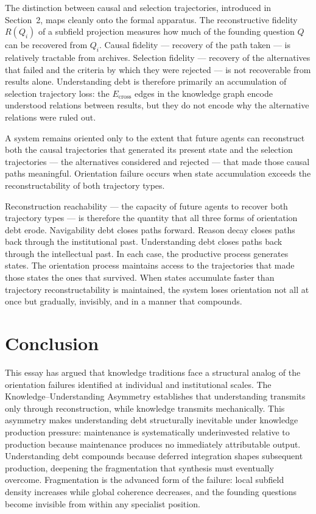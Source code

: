 The distinction between causal and selection trajectories, introduced in
Section~2, maps cleanly onto the formal apparatus. The reconstructive fidelity
$R(Q_i)$ of a subfield projection measures how much of the founding question
$Q$ can be recovered from $Q_i$. Causal fidelity --- recovery of the path
taken --- is relatively tractable from archives. Selection fidelity --- recovery
of the alternatives that failed and the criteria by which they were rejected
--- is not recoverable from results alone. Understanding debt is therefore
primarily an accumulation of selection trajectory loss: the $E_{\text{cross}}$
edges in the knowledge graph encode understood relations between results, but
they do not encode why the alternative relations were ruled out.

\begin{principle}
A system remains oriented only to the extent that future agents can reconstruct
both the causal trajectories that generated its present state and the selection
trajectories --- the alternatives considered and rejected --- that made those
causal paths meaningful. Orientation failure occurs when state accumulation
exceeds the reconstructability of both trajectory types.
\end{principle}

Reconstruction reachability --- the capacity of future agents to recover
both trajectory types --- is therefore the quantity that all three forms of
orientation debt erode. Navigability debt closes paths forward. Reason decay
closes paths back through the institutional past. Understanding debt closes
paths back through the intellectual past. In each case, the productive process
generates states. The orientation process maintains access to the trajectories
that made those states the ones that survived. When states accumulate faster
than trajectory reconstructability is maintained, the system loses orientation
not all at once but gradually, invisibly, and in a manner that compounds.

\section*{Conclusion}

This essay has argued that knowledge traditions face a structural analog of
the orientation failures identified at individual and institutional scales.
The Knowledge--Understanding Asymmetry establishes that understanding transmits
only through reconstruction, while knowledge transmits mechanically. This
asymmetry makes understanding debt structurally inevitable under knowledge
production pressure: maintenance is systematically underinvested relative
to production because maintenance produces no immediately attributable output.
Understanding debt compounds because deferred integration shapes subsequent
production, deepening the fragmentation that synthesis must eventually overcome.
Fragmentation is the advanced form of the failure: local subfield density
increases while global coherence decreases, and the founding questions become
invisible from within any specialist position.


